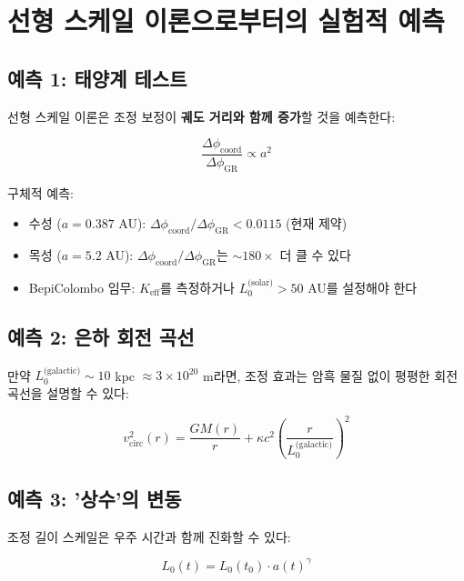 \documentclass[11pt,a4paper]{article}
\begin{document}
\section{선형 스케일 이론으로부터의 실험적 예측}
\label{sec:scale-predictions}

\subsection{예측 1: 태양계 테스트}

선형 스케일 이론은 조정 보정이 \textbf{궤도 거리와 함께 증가}할 것을 예측한다:

\begin{equation}
\frac{\Delta\phi_{\text{coord}}}{\Delta\phi_{\text{GR}}} \propto a^2
\end{equation}

구체적 예측:
\begin{itemize}
\item 수성 ($a = 0.387$ AU): $\Delta\phi_{\text{coord}}/\Delta\phi_{\text{GR}} < 0.0115$ (현재 제약)
\item 목성 ($a = 5.2$ AU): $\Delta\phi_{\text{coord}}/\Delta\phi_{\text{GR}}$는 $\sim 180\times$ 더 클 수 있다
\item BepiColombo 임무: $K_{\mathrm{eff}}$를 측정하거나 $L_0^{\text{(solar)}} > 50$ AU를 설정해야 한다
\end{itemize}

\subsection{예측 2: 은하 회전 곡선}

만약 $L_0^{\text{(galactic)}} \sim 10$ kpc $\approx 3\times10^{20}$ m라면, 조정 효과는 암흑 물질 없이 평평한 회전 곡선을 설명할 수 있다:

\begin{equation}
v_{\text{circ}}^2(r) = \frac{GM(r)}{r} + \kappa c^2 \left(\frac{r}{L_0^{\text{(galactic)}}}\right)^2
\end{equation}

\subsection{예측 3: '상수'의 변동}

조정 길이 스케일은 우주 시간과 함께 진화할 수 있다:

\begin{equation}
L_0(t) = L_0(t_0) \cdot a(t)^\gamma
\end{equation}
\end{document}
